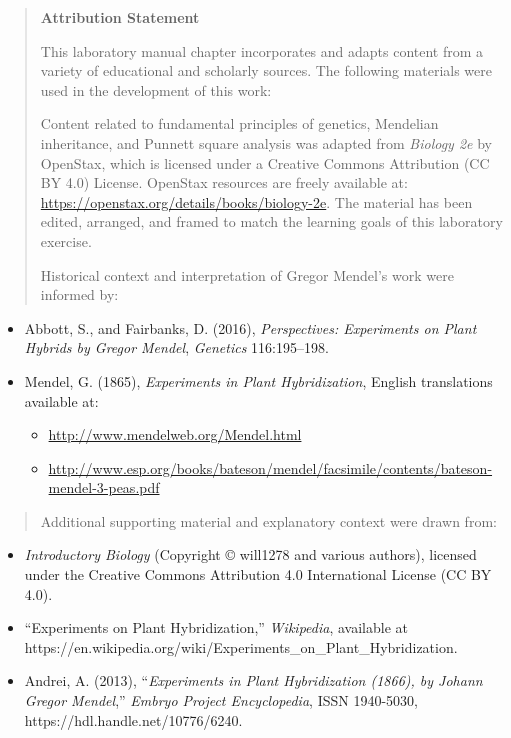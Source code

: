 \documentclass[
  letterpaper,
  DIV=11,
  numbers=noendperiod]{scrreprt}
\begin{document}
\begin{quote}
\textbf{Attribution Statement}

This laboratory manual chapter incorporates and adapts content from a
variety of educational and scholarly sources. The following materials
were used in the development of this work:

Content related to fundamental principles of genetics, Mendelian
inheritance, and Punnett square analysis was adapted from \emph{Biology
2e} by OpenStax, which is licensed under a Creative Commons Attribution
(CC BY 4.0) License. OpenStax resources are freely available at:
\url{https://openstax.org/details/books/biology-2e}. The material has
been edited, arranged, and framed to match the learning goals of this
laboratory exercise.

Historical context and interpretation of Gregor Mendel's work were
informed by:
\end{quote}

\begin{itemize}
\item
  Abbott, S., and Fairbanks, D. (2016), \emph{Perspectives: Experiments
  on Plant Hybrids by Gregor Mendel}, \emph{Genetics} 116:195--198.
\item
  Mendel, G. (1865), \emph{Experiments in Plant Hybridization}, English
  translations available at:

  \begin{itemize}
  \item
    \url{http://www.mendelweb.org/Mendel.html}
  \item
    \url{http://www.esp.org/books/bateson/mendel/facsimile/contents/bateson-mendel-3-peas.pdf}
  \end{itemize}
\end{itemize}

\begin{quote}
Additional supporting material and explanatory context were drawn from:
\end{quote}

\begin{itemize}
\item
  \emph{Introductory Biology} (Copyright © will1278 and various
  authors), licensed under the Creative Commons Attribution 4.0
  International License (CC BY 4.0).
\item
  ``Experiments on Plant Hybridization,'' \emph{Wikipedia}, available at
  https://en.wikipedia.org/wiki/Experiments\_on\_Plant\_Hybridization.
\item
  Andrei, A. (2013), ``\emph{Experiments in Plant Hybridization (1866),
  by Johann Gregor Mendel},'' \emph{Embryo Project Encyclopedia}, ISSN
  1940-5030, https://hdl.handle.net/10776/6240.
\end{itemize}
\end{document}
